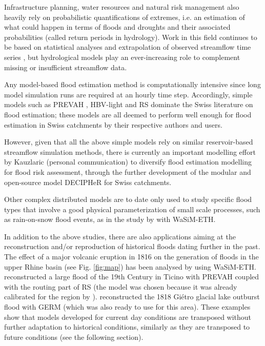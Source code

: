 \documentclass[10pt,a4paper]{article}
\begin{document}
Infrastructure planning, water resources and natural risk management
also heavily rely on probabilistic quantifications of extremes, i.e. an
estimation of what could happen in terms of floods and droughts and
their associated probabilities (called return periods in hydrology).
Work in this field continues to be based on statistical analyses and
extrapolation of observed streamflow time series \citep{Brunner2018,Asadi20108}, but
hydrological models play an ever-increasing role to complement missing
or insufficient streamflow data.

Any model-based flood estimation method is computationally intensive
since long model simulation runs are required at an hourly time step.
Accordingly, simple models such as PREVAH \citep{Viviroli_2009,Viviroli2009c,Felder2017},
HBV-light \citep{Brunner_2019a,Sikorska2017,Sikorska-Senoner2020} and 
RS \citep{Zeimetz2018,Zeimetz2017,Bieri2013} dominate the
Swiss literature on flood estimation; these models are all deemed to
perform well enough for flood estimation in Swiss catchments by their
respective authors and users. 

However, given that all the above simple models rely on similar
reservoir-based streamflow simulation methods, there is currently an
important modelling effort by Kauzlaric (personal communication) to
diversify flood estimation modelling for flood risk assessment, through
the further development of the modular and open-source model DECIPHeR
for Swiss catchments.

Other complex distributed models are to date only used to study specific
flood types that involve a good physical parameterization of small scale
processes, such as rain-on-snow flood events, as in the study
by \citet{Rossler2014} with WaSiM-ETH. 

In addition to the above studies, there are also applications aiming at
the reconstruction and/or reproduction of historical floods dating
further in the past. The effect of a major volcanic eruption in 1816 on
the generation of floods in the upper Rhine basin (see
Fig. \ref{fig:map}) has been analysed
by \citet{Rossler2018} using WaSiM-ETH. \citet{Stucki2018} reconstructed
a large flood of the 19th Century in Ticino with PREVAH coupled with the
routing part of RS (the model was chosen because it was already
calibrated for the region
by \citet{Andres_2016}). \citet{Ancey2019} reconstructed the 1818
Giétro glacial lake outburst flood with GERM (which was also ready to
use for this area). These examples show that models developed for
current day conditions are transposed without further adaptation to
historical conditions, similarly as they are transposed to future
conditions (see the following section).
\end{document}
